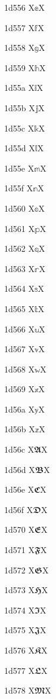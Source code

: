 \documentclass[11pt]{article}
\begin{document}
1d556 X{\ensuremath{\mathbb{e}}}X

1d557 X{\ensuremath{\mathbb{f}}}X

1d558 X{\ensuremath{\mathbb{g}}}X

1d559 X{\ensuremath{\mathbb{h}}}X

1d55a X{\ensuremath{\mathbb{i}}}X

1d55b X{\ensuremath{\mathbb{j}}}X

1d55c X{\ensuremath{\mathbb{k}}}X

1d55d X{\ensuremath{\mathbb{l}}}X

1d55e X{\ensuremath{\mathbb{m}}}X

1d55f X{\ensuremath{\mathbb{n}}}X

1d560 X{\ensuremath{\mathbb{o}}}X

1d561 X{\ensuremath{\mathbb{p}}}X

1d562 X{\ensuremath{\mathbb{q}}}X

1d563 X{\ensuremath{\mathbb{r}}}X

1d564 X{\ensuremath{\mathbb{s}}}X

1d565 X{\ensuremath{\mathbb{t}}}X

1d566 X{\ensuremath{\mathbb{u}}}X

1d567 X{\ensuremath{\mathbb{v}}}X

1d568 X{\ensuremath{\mathbb{w}}}X

1d569 X{\ensuremath{\mathbb{x}}}X

1d56a X{\ensuremath{\mathbb{y}}}X

1d56b X{\ensuremath{\mathbb{z}}}X

1d56c X{\ensuremath{\mathbffrak{A}}}X

1d56d X{\ensuremath{\mathbffrak{B}}}X

1d56e X{\ensuremath{\mathbffrak{C}}}X

1d56f X{\ensuremath{\mathbffrak{D}}}X

1d570 X{\ensuremath{\mathbffrak{E}}}X

1d571 X{\ensuremath{\mathbffrak{F}}}X

1d572 X{\ensuremath{\mathbffrak{G}}}X

1d573 X{\ensuremath{\mathbffrak{H}}}X

1d574 X{\ensuremath{\mathbffrak{I}}}X

1d575 X{\ensuremath{\mathbffrak{J}}}X

1d576 X{\ensuremath{\mathbffrak{K}}}X

1d577 X{\ensuremath{\mathbffrak{L}}}X

1d578 X{\ensuremath{\mathbffrak{M}}}X
\end{document}
